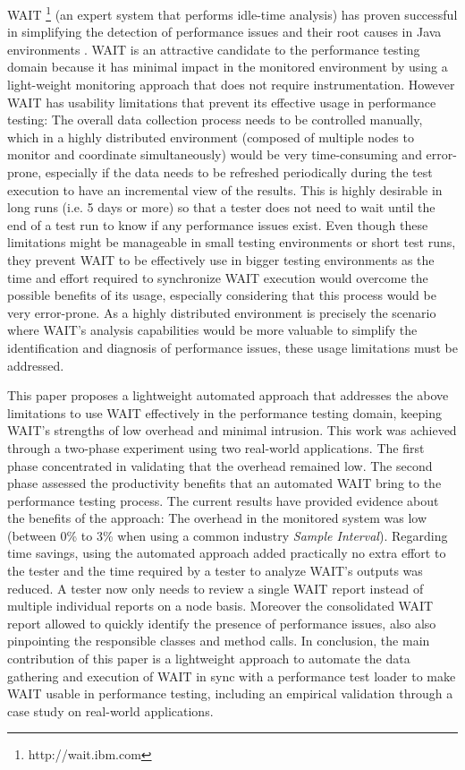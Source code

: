 \documentclass[runningheads,a4paper]{llncs}
\begin{document}
WAIT \footnote{http://wait.ibm.com} (an expert system that performs idle-time
analysis) has proven successful in simplifying the detection of performance
issues and their root causes in Java environments \cite{Altman2010,Wu1}.
WAIT is an attractive candidate to the performance testing domain because it has
minimal impact in the monitored environment by using a light-weight monitoring
approach that does not require instrumentation. However WAIT has usability
limitations that prevent its effective usage in performance testing: The overall
data collection process needs to be controlled manually, which in a highly
distributed environment (composed of multiple nodes to monitor and coordinate
simultaneously) would be very time-consuming and error-prone, especially if the
data needs to be refreshed periodically during the test execution to have an
incremental view of the results. This is highly desirable in long runs (i.e. 5
days or more) so that a tester does not need to wait until the end of a test run
to know if any performance issues exist. Even though these limitations might be
manageable in small testing environments or short test runs, they prevent WAIT
to be effectively use in bigger testing environments as the time and effort
required to synchronize WAIT execution would overcome the possible benefits of
its usage, especially considering that this process would be very error-prone.
As a highly distributed environment is precisely the scenario where WAIT's
analysis capabilities would be more valuable to simplify the identification and
diagnosis of performance issues, these usage limitations must be addressed.

This paper proposes a lightweight automated approach that addresses the above
limitations to use WAIT effectively in the performance testing domain, keeping
WAIT's strengths of low overhead and minimal intrusion. This work was achieved
through a two-phase experiment using two real-world applications. The first
phase concentrated in validating that the overhead remained low. The second
phase assessed the productivity benefits that an automated WAIT bring to the
performance testing process. The current results have provided evidence about
the benefits of the approach: The overhead in the monitored system was low
(between 0\% to 3\% when using a common industry \emph{Sample Interval}).
Regarding time savings, using the automated approach added practically no extra
effort to the tester and the time required by a tester to analyze WAIT's outputs
was reduced. A tester now only needs to review a single WAIT report instead of
multiple individual reports on a node basis. Moreover the consolidated WAIT
report allowed to quickly identify the presence of performance issues, also also
pinpointing the responsible classes and method calls. In conclusion, the main
contribution of this paper is a lightweight approach to automate the data
gathering and execution of WAIT in sync with a performance test loader to make
WAIT usable in performance testing, including an empirical validation through a
case study on real-world applications.
\end{document}
